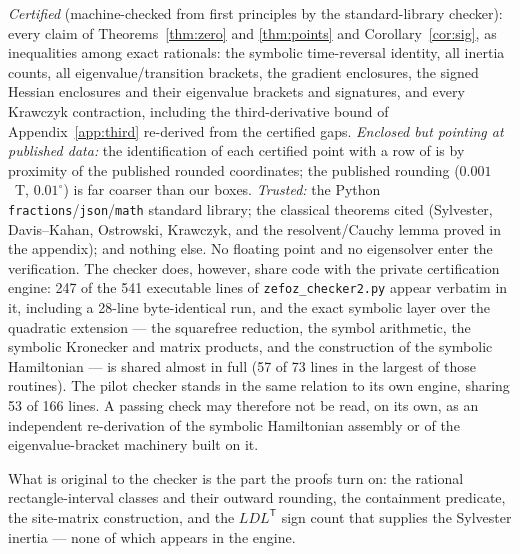 \documentclass[11pt]{amsart}
\theoremstyle{plain}
\theoremstyle{definition}
\theoremstyle{remark}
\begin{document}
\emph{Certified} (machine-checked from first principles by the standard-library
checker): every claim of Theorems~\ref{thm:zero} and \ref{thm:points} and
Corollary~\ref{cor:sig}, as inequalities among exact rationals: the symbolic
time-reversal identity, all inertia counts, all eigenvalue/transition brackets,
the gradient enclosures, the signed Hessian enclosures and their eigenvalue
brackets and signatures, and every Krawczyk contraction, including the
third-derivative bound of Appendix~\ref{app:third} re-derived from the
certified gaps.  \emph{Enclosed but pointing at published data:} the
identification of each certified point with a row of \cite[Table~5]{Matsuura}
is by proximity of the published rounded coordinates; the published rounding
($0.001$~T, $0.01^\circ$) is far coarser than our boxes.  \emph{Trusted:} the
Python \texttt{fractions}/\texttt{json}/\texttt{math} standard library; the
classical theorems cited (Sylvester, Davis--Kahan, Ostrowski, Krawczyk, and
the resolvent/Cauchy lemma proved in the appendix); and nothing else.  No
floating point and no eigensolver enter the verification.  The checker does,
however, share code with the private certification engine: 247 of the 541
executable lines of \texttt{zefoz\_checker2.py} appear
verbatim in it, including a 28-line byte-identical run, and the exact
symbolic layer over the quadratic extension --- the squarefree reduction,
the symbol arithmetic, the symbolic Kronecker and matrix products, and the
construction of the symbolic Hamiltonian --- is shared almost in full (57
of 73 lines in the largest of those routines). The pilot checker stands in
the same relation to its own engine, sharing 53 of 166 lines. A passing
check may therefore not be read, on its own, as an independent
re-derivation of the symbolic Hamiltonian assembly or of the
eigenvalue-bracket machinery built on it.

What is original to the checker is the part the proofs turn on: the
rational rectangle-interval classes and their outward rounding, the
containment predicate, the site-matrix construction, and the $LDL^{\mathsf T}$ sign
count that supplies the Sylvester inertia --- none of which appears in the
engine.
\end{document}
